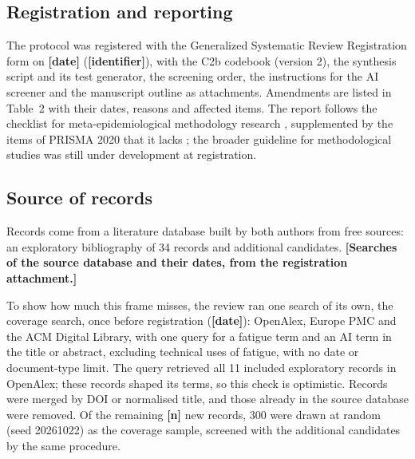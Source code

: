 \documentclass[11pt]{article}
\newcommand{\tbd}[1]{\textbf{[#1]}}
\begin{document}
\subsection{Registration and reporting}
The protocol was registered with the Generalized Systematic Review Registration form \citep{vandenakker2023} on
\tbd{date} (\tbd{identifier}), with the C2b codebook (version 2), the synthesis script and its test generator, the
screening order, the instructions for the AI screener and the manuscript outline as attachments. Amendments are listed in Table~2 with their dates, reasons
and affected items. The report follows the checklist for meta-epidemiological methodology research
\citep{murad2017}, supplemented by the items of PRISMA 2020 that it lacks \citep{page2021}; the broader guideline for
methodological studies \citep{lawson2020} was still under development at registration.

\subsection{Source of records}
Records come from a literature database built by both authors from free sources: an exploratory bibliography of 34
records and additional candidates. \tbd{Searches of the source database and their dates, from the registration
attachment.}

To show how much this frame misses, the review ran one search of its own, the coverage search, once before
registration (\tbd{date}): OpenAlex, Europe PMC and the ACM Digital Library, with one query for a fatigue term and an
AI term in the title or abstract, excluding technical uses of fatigue, with no date or document-type limit. The query
retrieved all 11 included exploratory records in OpenAlex; these records shaped its terms, so this check is
optimistic. Records were merged by DOI or normalised title, and those already in the source database were removed. Of
the remaining \tbd{n} new records, 300 were drawn at random (seed 20261022) as the coverage sample, screened with the
additional candidates by the same procedure.
\end{document}
